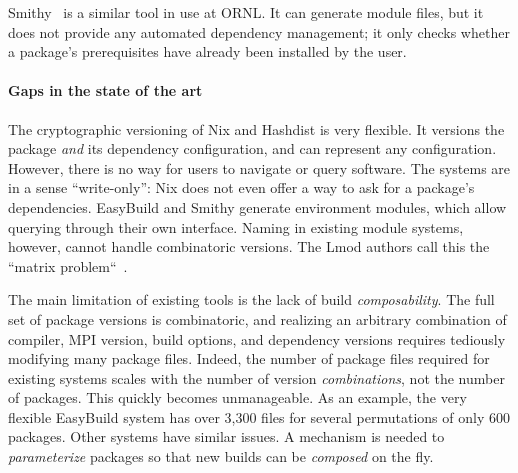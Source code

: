 Smithy~\cite{digirolamo:smithy} is a similar tool in use at ORNL. It
can generate module files, but it does not provide any 
automated dependency management; it only checks whether a package's
prerequisites have already been installed by the user.

\paragraph{Gaps in the state of the art}
The cryptographic versioning of Nix and Hashdist is very flexible.  It versions
the package {\it and} its dependency configuration, and can represent any
configuration. However, there is no way for users to navigate or query
software. The systems are in a sense ``write-only'':
Nix does not even offer a way to ask for a package's dependencies.
%
EasyBuild and Smithy generate environment modules, which allow querying
through their own interface. Naming in existing module systems, however, cannot
handle combinatoric versions. The Lmod authors call this the
``matrix problem``~\cite{mclay:lmod-tutorial}.



The main limitation of existing tools is the lack of build {\it composability}.
The full set of package versions is combinatoric, and realizing an arbitrary
combination of compiler, MPI version, build options, and dependency versions
requires tediously modifying many package files.
%
Indeed, the number of package files required for existing systems scales with
the number of version {\it combinations}, not the number of packages.
This quickly becomes unmanageable.  As an example, the very flexible EasyBuild
system has over 3,300 files for several permutations of only 600 packages. 
Other systems have similar issues. A mechanism is needed to {\it parameterize}
packages so that new builds can be {\it composed} on the fly.











